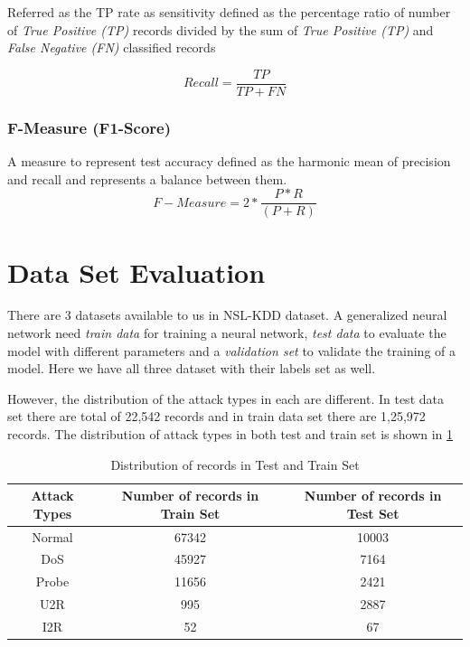 \documentclass[12pt, a4paper]{report}
\begin{document}
Referred as the TP rate as sensitivity defined as the percentage ratio of number of \textit{True Positive (TP)} records divided by the sum of \textit{True Positive (TP)} and \textit{False Negative (FN)} classified records

\begin{equation}
Recall = \frac{TP}{TP+FN}
\end{equation}

\subsubsection{F-Measure (F1-Score)}
A measure to represent test accuracy defined as the harmonic mean of precision and recall and represents a balance between them.
\begin{equation}
F-Measure =	2*\frac{P*R}{(P+R)}
\end{equation}
\clearpage
\section {Data Set Evaluation}\label{sec:datasetEvaluation}

There are 3 datasets available to us in NSL-KDD dataset. A generalized neural network need \textit{train data} for training a neural network, \textit{test data} to evaluate the model with different parameters and a \textit{validation set} to validate the training of a model. Here we have all three dataset with their labels set as well.\\ \par

However, the distribution of the attack types in each are different. In test data set there are total of 22,542 records and in train data set there are 1,25,972 records.  
The distribution of attack types in both test and train set is shown in \ref{table:test_train}\\ \par 
\begin{table}[h]
\centering
\begin{tabular}{|c|c|c|}
\hline
\textbf{Attack Types} & \textbf{Number of records in Train Set} & \textbf{Number of records in Test Set} \\ \hline
Normal                & 67342                                   & 10003                                  \\ \hline
DoS                   & 45927                                   & 7164                                   \\ \hline
Probe                 & 11656                                   & 2421                                   \\ \hline
U2R                   & 995                                     & 2887                                   \\ \hline
I2R                   & 52                                      & 67                                     \\ \hline
\end{tabular}
\caption{Distribution of records in Test and Train Set}
\label{table:test_train}
\end{table}
\end{document}
